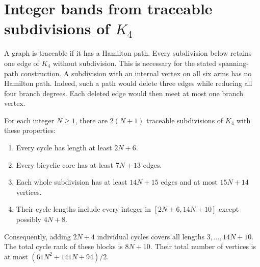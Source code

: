 \section{Integer bands from traceable subdivisions of $K_4$}
\label{sec:rhost-k4-bands}

A graph is traceable if it has a Hamilton path.
Every subdivision below retains one edge of $K_4$ without subdivision.
This is necessary for the stated spanning-path construction.
A subdivision with an internal vertex on all six arms has no Hamilton path.
Indeed, such a path would delete three edges while reducing all four branch degrees.
Each deleted edge would then meet at most one branch vertex.

\begin{lemma}\label{lem:rhost-k4-bands}
For each integer $N\ge1$, there are $2(N+1)$ traceable subdivisions of $K_4$ with these properties:
\begin{enumerate}
\item Every cycle has length at least $2N+6$.
\item Every bicyclic core has at least $7N+13$ edges.
\item Each whole subdivision has at least $14N+15$ edges and at most $15N+14$ vertices.
\item Their cycle lengths include every integer in $[2N+6,14N+10]$ except possibly $4N+8$.
\end{enumerate}
Consequently, adding $2N+4$ individual cycles covers all lengths $3,\ldots,14N+10$.
The total cycle rank of these blocks is $8N+10$.
Their total number of vertices is at most $(61N^2+141N+94)/2$.
\end{lemma}

